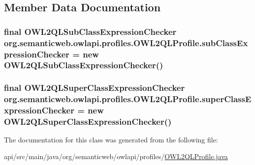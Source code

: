 \subsection{Member Data Documentation}
\hypertarget{classorg_1_1semanticweb_1_1owlapi_1_1profiles_1_1_o_w_l2_q_l_profile_a403b22f82ed4722e802763a05809efdc}{
\subsubsection[{sub\-Class\-Expression\-Checker}]{\setlength{\rightskip}{0pt plus 5cm}final O\-W\-L2\-Q\-L\-Sub\-Class\-Expression\-Checker org.\-semanticweb.\-owlapi.\-profiles.\-O\-W\-L2\-Q\-L\-Profile.\-sub\-Class\-Expression\-Checker = new O\-W\-L2\-Q\-L\-Sub\-Class\-Expression\-Checker()\hspace{0.3cm}{\ttfamily [private]}}}\label{classorg_1_1semanticweb_1_1owlapi_1_1profiles_1_1_o_w_l2_q_l_profile_a403b22f82ed4722e802763a05809efdc}
\hypertarget{classorg_1_1semanticweb_1_1owlapi_1_1profiles_1_1_o_w_l2_q_l_profile_a903c2f3221a964ee6402e2381fb8b666}{
\subsubsection[{super\-Class\-Expression\-Checker}]{\setlength{\rightskip}{0pt plus 5cm}final {\bf O\-W\-L2\-Q\-L\-Super\-Class\-Expression\-Checker} org.\-semanticweb.\-owlapi.\-profiles.\-O\-W\-L2\-Q\-L\-Profile.\-super\-Class\-Expression\-Checker = new {\bf O\-W\-L2\-Q\-L\-Super\-Class\-Expression\-Checker}()\hspace{0.3cm}{\ttfamily [private]}}}\label{classorg_1_1semanticweb_1_1owlapi_1_1profiles_1_1_o_w_l2_q_l_profile_a903c2f3221a964ee6402e2381fb8b666}


The documentation for this class was generated from the following file\-:\begin{DoxyCompactItemize}
\item 
api/src/main/java/org/semanticweb/owlapi/profiles/\hyperlink{_o_w_l2_q_l_profile_8java}{O\-W\-L2\-Q\-L\-Profile.\-java}\end{DoxyCompactItemize}
